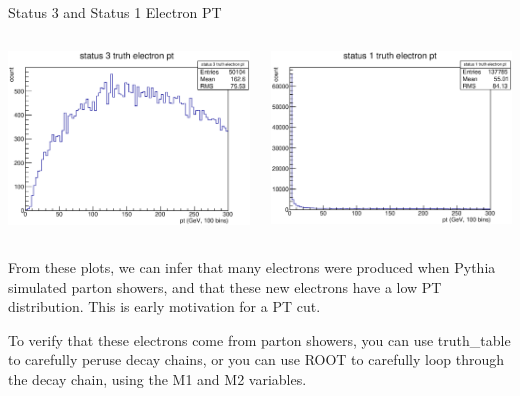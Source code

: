 \documentclass{beamer}
\begin{document}
	\begin{frame}{Status 3 and Status 1 Electron PT}
		\begin{columns}
			\begin{column}{0.5\textwidth}
				\includegraphics[width = \linewidth]{truth_electron_3_pt.eps}
			\end{column}
			\begin{column}{0.5\textwidth}
				\includegraphics[width = \linewidth]{truth_electron_1_pt.eps}
			\end{column}
		\end{columns}
From these plots, we can infer that many electrons were produced when Pythia simulated parton showers, and that these new electrons have a low PT distribution. This is early motivation for a PT cut.

\bigskip

To verify that these electrons come from parton showers, you can use truth\_table to carefully peruse decay chains, or you can use ROOT to carefully loop through the decay chain, using the M1 and M2 variables.
	\end{frame}
\end{document}
